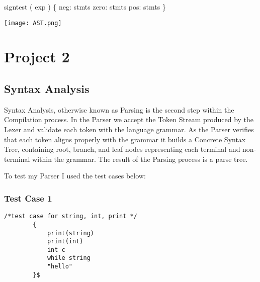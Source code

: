 \documentclass[letterpaper, 10pt,DIV=13]{scrartcl}
\numberwithin{equation}{section} %
\numberwithin{figure}{section} %
\numberwithin{table}{section} %
\begin{document}
    signtest ( exp ) \{ \newline
    \space    neg: stmts \newline
    \space    zero: stmts \newline
    \space    pos: stmts \newline
    \} \newline

    \begin{center}
        \texttt{[image: AST.png]}
    \end{center}



\pagebreak

\section{Project 2}

\subsection{Syntax Analysis}
Syntax Analysis, otherwise known as Parsing is the second step within the Compilation process. In the Parser we accept the Token Stream produced by the Lexer and validate each token with the language grammar. As the Parser verifies that each token aligns properly with the grammar it builds a Concrete Syntax Tree, containing root, branch, and leaf nodes representing each terminal and non-terminal within the grammar. The result of the Parsing process is a parse tree.

To test my Parser I used the test cases below:


\subsubsection*{Test Case 1}
    \lstset{numbers=left, numberstyle=\tiny, stepnumber=1, numbersep=5pt, basicstyle=\footnotesize\ttfamily}
    \begin{lstlisting}[frame=single, ]
        /*test case for string, int, print */
        {
            print(string)
            print(int)
            int c
            while string
            "hello"
        }$
        
    \end{lstlisting}
\end{document}
